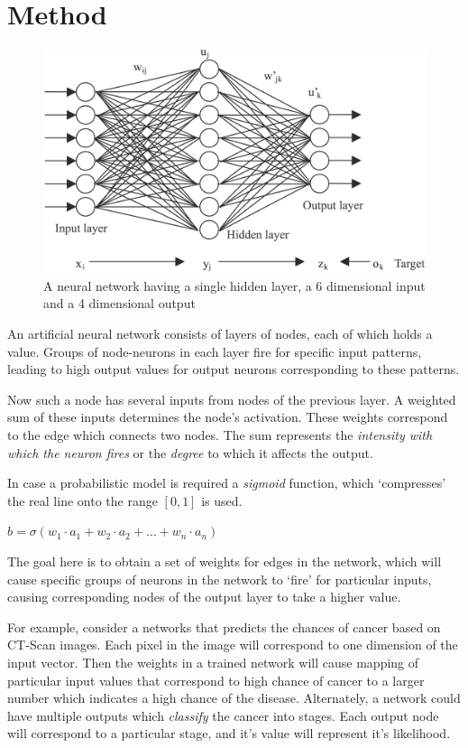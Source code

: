 \documentclass[11pt,a4paper]{article}
\begin{document}
\section{Method}
\begin{figure}
	\includegraphics[width=\linewidth]{NeuralNetwork.png}
	\caption{A neural network having a single hidden layer, a 6 dimensional input and a 4 dimensional output}
	\label{fig:network}
\end{figure}
An artificial neural network consists of layers of nodes, each of which holds a value. Groups of node-neurons in each layer fire for specific input patterns, leading to high output values for output neurons corresponding to these patterns.

Now such a node has several inputs from nodes of the previous layer. A weighted sum of these inputs determines the node's activation. These weights correspond to the edge which connects two nodes. The sum represents the \emph{intensity with which the neuron fires} or the \emph{degree} to which it affects the output.

In case a probabilistic model is required a \emph{sigmoid} function, which `compresses' the real line onto the range $ [0, 1] $ is used.

\begin{center}
	$ b = \sigma(w_{1} \cdot a_{1} + w_{2} \cdot a_{2} + \ldots + w_{n} \cdot a_{n}) $
\end{center}


The goal here is to obtain a set of weights for edges in the network, which will cause specific groups of neurons in the network to `fire' for particular inputs, causing corresponding nodes of the output layer to take a higher value.

For example, consider a networks that predicts the chances of cancer based on CT-Scan images. Each pixel in the image will correspond to one dimension of the input vector. Then the weights in a trained network will cause mapping of particular input values that correspond to high chance of cancer to a larger number which indicates a high chance of the disease. Alternately, a network could have multiple outputs which \emph{classify} the cancer into stages. Each output node will correspond to a particular stage, and it's value will represent it's likelihood.
\end{document}
